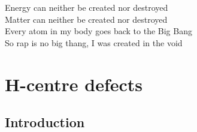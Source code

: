 \begin{savequote}[8cm]
Energy can neither be created nor destroyed \\
Matter can neither be created nor destroyed \\
Every atom in my body goes back to the Big Bang \\
So rap is no big thang, I was created in the void
\end{savequote}

\chapter{\label{ch:6-defects}H-centre defects}

\section{Introduction}




